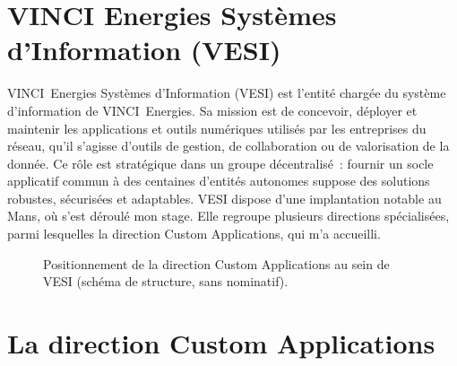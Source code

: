 \section{VINCI Energies Systèmes d'Information (VESI)}
\label{sec:vesi}

VINCI~Energies Systèmes d'Information (VESI) est l'entité chargée du système
d'information de VINCI~Energies. Sa mission est de concevoir, déployer et
maintenir les applications et outils numériques utilisés par les entreprises
du réseau, qu'il s'agisse d'outils de gestion, de collaboration ou de
valorisation de la donnée. Ce rôle est stratégique dans un groupe
décentralisé~: fournir un socle applicatif commun à des centaines d'entités
autonomes suppose des solutions robustes, sécurisées et adaptables. VESI
dispose d'une implantation notable au Mans, où s'est déroulé mon stage. Elle
regroupe plusieurs directions spécialisées, parmi lesquelles la direction
Custom Applications, qui m'a accueilli.

\begin{figure}[H]
  \centering
  \caption{Positionnement de la direction Custom Applications au sein de VESI
    (schéma de structure, sans nominatif).}
  \label{fig:vesi}
\end{figure}

\section{La direction Custom Applications}
\label{sec:custom-apps}

